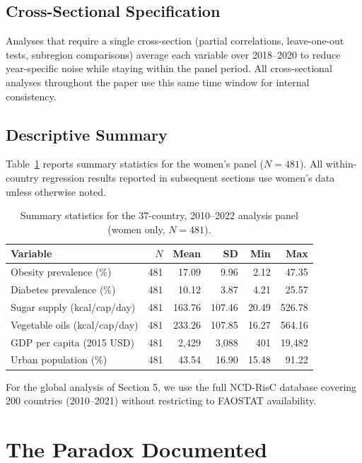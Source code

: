 \documentclass[letterpaper,11pt,leqno]{article}
\begin{document}
\subsection{Cross-Sectional Specification}

Analyses that require a single cross-section (partial correlations, leave-one-out tests, subregion comparisons) average each variable over 2018--2020 to reduce year-specific noise while staying within the panel period. All cross-sectional analyses throughout the paper use this same time window for internal consistency.

\subsection{Descriptive Summary}

Table~\ref{tab:descriptives} reports summary statistics for the women's panel ($N = 481$). All within-country regression results reported in subsequent sections use women's data unless otherwise noted.

\begin{table}[htbp]
\caption{Summary statistics for the 37-country, 2010--2022 analysis panel (women only, $N = 481$).}
\label{tab:descriptives}
\begin{tabular*}{\textwidth}{@{\extracolsep\fill}lrrrrr}
\toprule
Variable & $N$ & Mean & SD & Min & Max \\
\midrule
Obesity prevalence (\%) & 481 & 17.09 & 9.96 & 2.12 & 47.35 \\
Diabetes prevalence (\%) & 481 & 10.12 & 3.87 & 4.21 & 25.57 \\
Sugar supply (kcal/cap/day) & 481 & 163.76 & 107.46 & 20.49 & 526.78 \\
Vegetable oils (kcal/cap/day) & 481 & 233.26 & 107.85 & 16.27 & 564.16 \\
GDP per capita (2015 USD) & 481 & 2,429 & 3,088 & 401 & 19,482 \\
Urban population (\%) & 481 & 43.54 & 16.90 & 15.48 & 91.22 \\
\bottomrule
\end{tabular*}
\end{table}

For the global analysis of Section 5, we use the full NCD-RisC database covering 200 countries (2010--2021) without restricting to FAOSTAT availability.

\section{The Paradox Documented}
\end{document}
